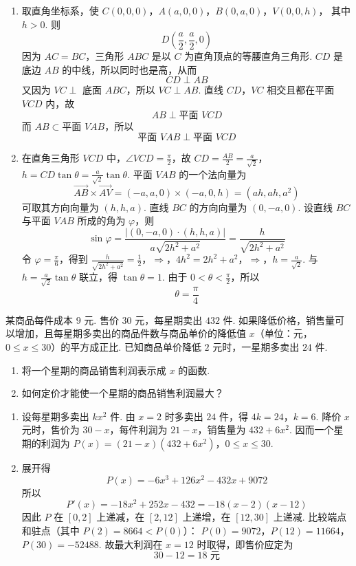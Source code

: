 \begin{solution}
\begin{enumerate}
\item
取直角坐标系，使
\(C(0,0,0)\)，\(A(a,0,0)\)，\(B(0,a,0)\)，\(V(0,0,h)\)，
其中 \(h>0\). 则
\[
D\left(\frac a2,\frac a2,0\right)
\]
因为 \(AC=BC\)，三角形 \(ABC\) 是以 \(C\) 为直角顶点的等腰直角三角形. \(CD\) 是底边 \(AB\) 的中线，所以同时也是高，从而
\[
CD\perp AB
\]
又因为 \(VC\perp\) 底面 \(ABC\)，所以 \(VC\perp AB\). 直线 \(CD\)，\(VC\) 相交且都在平面 \(VCD\) 内，故
\[
AB\perp\text{平面 }VCD
\]
而 \(AB\subset\text{平面 }VAB\)，所以
\[
\text{平面 }VAB\perp\text{平面 }VCD
\]
\item
在直角三角形 \(VCD\) 中，\(\angle VCD=\frac{\pi}{2}\)，故
\(CD=\frac{AB}{2}=\frac{a}{\sqrt2}\)，\(h=CD\tan\theta=\frac{a}{\sqrt2}\tan\theta\).
平面 \(VAB\) 的一个法向量为
\[
\overrightarrow{AB}\times\overrightarrow{AV}
=(-a,a,0)\times(-a,0,h)=(ah,ah,a^2)
\]
可取其方向向量为 \((h,h,a)\). 直线 \(BC\) 的方向向量为 \((0,-a,0)\). 设直线 \(BC\) 与平面 \(VAB\) 所成的角为 \(\varphi\)，则
\[
\sin\varphi
=\frac{|(0,-a,0)\cdot(h,h,a)|}
{a\sqrt{2h^2+a^2}}
=\frac{h}{\sqrt{2h^2+a^2}}
\]
令 \(\varphi=\frac{\pi}{6}\)，得到
\(\frac{h}{\sqrt{2h^2+a^2}}=\frac12\)，\(\Longrightarrow\)，\(4h^2=2h^2+a^2\)，\(\Longrightarrow\)，\(h=\frac{a}{\sqrt2}\).
与 \(h=\frac{a}{\sqrt2}\tan\theta\) 联立，得 \(\tan\theta=1\). 由于 \(0<\theta<\frac{\pi}{2}\)，所以
\[
\theta=\frac{\pi}{4}
\]
\end{enumerate}
\end{solution}

\begin{problem}
某商品每件成本 \(9\) 元. 售价 \(30\) 元，每星期卖出 \(432\) 件. 如果降低价格，销售量可以增加，且每星期多卖出的商品件数与商品单价的降低值 \(x\)（单位：元，\(0 \leqslant x \leqslant 30\)）的平方成正比. 已知商品单价降低 \(2\) 元时，一星期多卖出 \(24\) 件.
\begin{enumerate}
\item 将一个星期的商品销售利润表示成 \(x\) 的函数.
\item 如何定价才能使一个星期的商品销售利润最大？
\end{enumerate}
\end{problem}

\begin{solution}
\begin{enumerate}
\item
设每星期多卖出 \(kx^2\) 件. 由 \(x=2\) 时多卖出 \(24\) 件，得
\(4k=24\)，\(k=6\).
降价 \(x\) 元时，售价为 \(30-x\)，每件利润为 \(21-x\)，销售量为 \(432+6x^2\). 因而一个星期的利润为
\(P(x)=(21-x)(432+6x^2)\)，\(0\leqslant x\leqslant30\).
\item
展开得
\[
P(x)=-6x^3+126x^2-432x+9072
\]
所以
\[
P'(x)=-18x^2+252x-432=-18(x-2)(x-12)
\]
因此 \(P\) 在 \([0,2]\) 上递减，在 \([2,12]\) 上递增，在 \([12,30]\) 上递减. 比较端点和驻点（其中 \(P(2)=8664<P(0)\)）：
\(P(0)=9072\)，\(P(12)=11664\)，\(P(30)=-52488\).
故最大利润在 \(x=12\) 时取得，即售价应定为
\[
30-12=18\text{ 元}
\]
\end{enumerate}
\end{solution}

